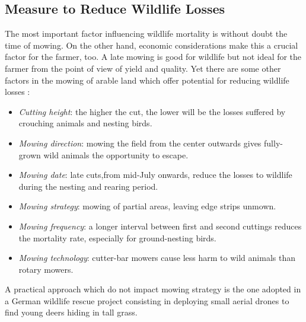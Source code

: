 \subsection{Measure to Reduce Wildlife Losses} %
\label{sub:measure_to_reduce_wildlife_losses}
 The most important factor influencing wildlife mortality is without doubt the time of mowing. On the other hand, economic considerations make this a crucial factor for the farmer, too. A late mowing is good for wildlife but not ideal for the farmer from the point of view of yield and quality. Yet there are some other factors in the mowing of arable land which offer potential for reducing wildlife losses \cite{MowlingMortality}:
\begin{itemize}
	\item \textit{Cutting height}: the higher the cut, the lower will be the losses suffered by crouching animals and nesting birds.
	\item \textit{Mowing direction}: mowing the field from the center outwards gives fully-grown wild animals the opportunity to escape.
	\item \textit{Mowing date}: late cuts,from mid-July onwards, reduce the losses to wildlife during the nesting and rearing period.
	\item \textit{Mowing strategy}: mowing of partial areas, leaving edge strips unmown.
	\item \textit{Mowing frequency}: a longer interval between first and second cuttings reduces the mortality rate, especially for ground-nesting birds.
	\item \textit{Mowing technology}: cutter-bar mowers cause less harm to wild animals than rotary mowers.
\end{itemize}
A practical approach which do not impact mowing strategy is the one adopted in a German wildlife rescue project consisting in deploying small aerial drones to find young deers hiding in tall grass.

